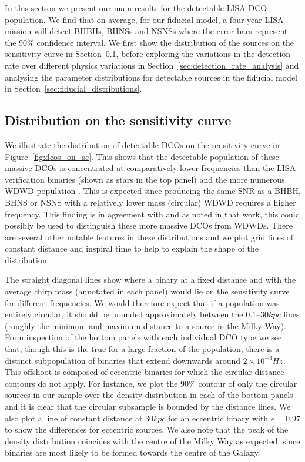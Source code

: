 In this section we present our main results for the detectable LISA DCO population. We find that on average, for our fiducial model, a four year LISA mission will detect  BHBHs,  BHNSs and  NSNSs where the error bars represent the 90\% confidence interval. We first show the distribution of the sources on the sensitivity curve in Section~\ref{sec:dcos_on_sc}, before exploring the variations in the detection rate over different physics variations in Section~\ref{sec:detection_rate_analysis} and analysing the parameter distributions for detectable sources in the fiducial model in Section~\ref{sec:fiducial_distributions}.

\subsection{Distribution on the sensitivity curve}\label{sec:dcos_on_sc}

We illustrate the distribution of detectable DCOs on the sensitivity curve in Figure~\ref{fig:dcos_on_sc}. This shows that the detectable population of these massive DCOs is concentrated at comparatively lower frequencies than the LISA verification binaries (shown as stars in the top panel) and the more numerous WDWD population \citep[e.g.][]{Korol+2017}. This is expected since producing the same SNR as a BHBH, BHNS or NSNS with a relatively lower mass (circular) WDWD requires a higher frequency. This finding is in agreement with \citet{Sesana+2020} and as noted in that work, this could possibly be used to distinguish these more massive DCOs from WDWDs. There are several other notable features in these distributions and we plot grid lines of constant distance and inspiral time to help to explain the shape of the distribution.

The straight diagonal lines show where a binary at a fixed distance and with the average chirp mass (annotated in each panel) would lie on the sensitivity curve for different frequencies. We would therefore expect that if a population was entirely circular, it should be bounded approximately between the $0.1$--$30 \unit{kpc}$ lines (roughly the minimum and maximum distance to a source in the Milky Way). From inspection of the bottom panels with each individual DCO type we see that, though this is the true for a large fraction of the population, there is a distinct subpopulation of binaries that extend downwards around $2 \times 10^{-3} \unit{Hz}$. This offshoot is composed of eccentric binaries for which the circular distance contours do not apply. For instance, we plot the 90\% contour of only the circular sources in our sample over the density distribution in each of the bottom panels and it is clear that the circular subsample is bounded by the distance lines. We also plot a line of constant distance at $30 \unit{kpc}$ for an eccentric binary with $e = 0.97$ to show the differences for eccentric sources. We also note that the peak of the density distribution coincides with the centre of the Milky Way as expected, since binaries are most likely to be formed towards the centre of the Galaxy.

